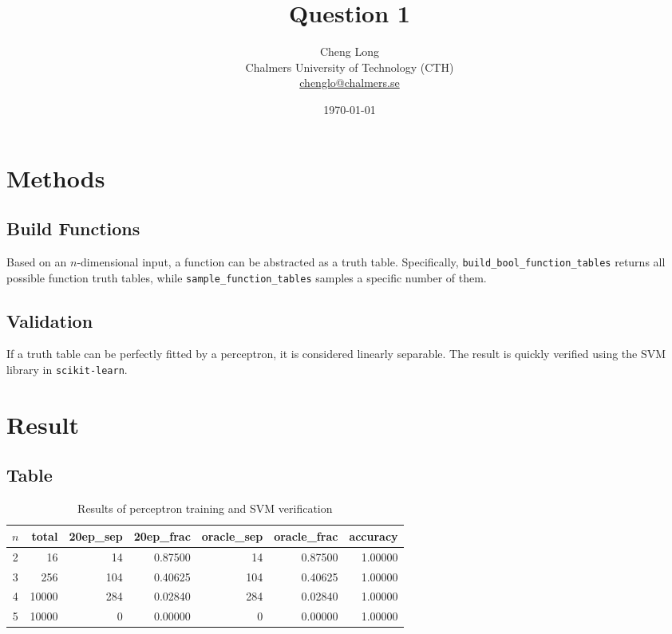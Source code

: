 \documentclass[11pt,a4paper]{article}
\title{Question 1}
\author{Cheng Long\\
Chalmers University of Technology (CTH)\\
\href{mailto:chenglo@chalmers.se}{chenglo@chalmers.se}}
\date{\today}
\begin{document}
\maketitle

\section{Methods}
\subsection{Build Functions}
Based on an $n$-dimensional input, a function can be abstracted as a truth table. Specifically, 
\texttt{build\_bool\_function\_tables} returns all possible function truth tables, 
while \texttt{sample\_function\_tables} samples a specific number of them.

\subsection{Validation}
If a truth table can be perfectly fitted by a perceptron, it is considered linearly separable. 
The result is quickly verified using the SVM library in \texttt{scikit-learn}.

\section{Result}
\subsection{Table}
\begin{table}[h]
\centering
\begin{tabular}{|c|r|r|r|r|r|r|}
\hline
$n$ & total & 20ep\_sep & 20ep\_frac & oracle\_sep & oracle\_frac & accuracy \\
\hline
2 &    16 &   14 & 0.87500 &   14 & 0.87500 & 1.00000 \\
3 &   256 &  104 & 0.40625 &  104 & 0.40625 & 1.00000 \\
4 & 10000 &  284 & 0.02840 &  284 & 0.02840 & 1.00000 \\
5 & 10000 &    0 & 0.00000 &    0 & 0.00000 & 1.00000 \\
\hline
\end{tabular}
\caption{Results of perceptron training and SVM verification}
\label{tab:results}
\end{table}
\end{document}
